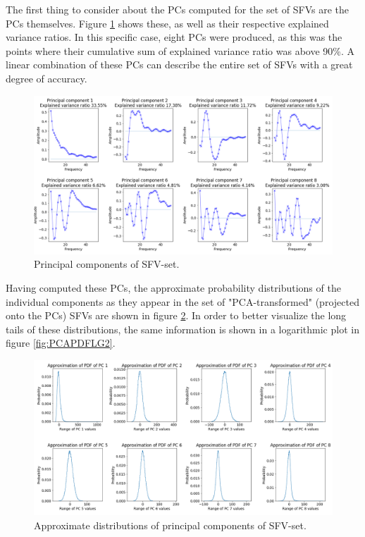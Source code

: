 \documentclass{kththesis}
\begin{document}
The first thing to consider about the PCs computed for the set of SFVs are the PCs themselves.
Figure \ref{fig:PCS} shows these, as well as their respective explained variance ratios. 
In this specific case, eight PCs were produced, as this was the points where their cumulative sum of explained variance ratio was above 90\%.
A linear combination of these PCs can describe the entire set of SFVs with a great degree of accuracy.

\begin{figure}[H]
    \centering
    \centerline{\includegraphics[width=1.2\textwidth]{images/PCA/PCS.png}}
    \caption{Principal components of SFV-set.}
    \label{fig:PCS}
\end{figure}

Having computed these PCs, the approximate probability distributions of the individual components as they appear in the set of "PCA-transformed" (projected onto the PCs) SFVs are shown in figure \ref{fig:PCAPDF}. 
In order to better visualize the long tails of these distributions, the same information is shown in a logarithmic plot in figure \ref{fig:PCAPDFLG2}.

\begin{figure}[H]
    \centering
    \centerline{\includegraphics[width=1.3\textwidth]{images/PCA/PCAPDF.png}}
    \caption{Approximate distributions of principal components of SFV-set.}
    \label{fig:PCAPDF}
\end{figure}
\end{document}
